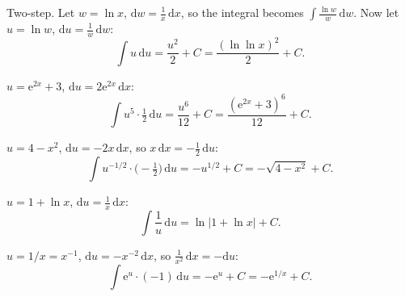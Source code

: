 \begin{solutions}
  \item Two-step. Let $w=\ln x$, $\mathrm{d}w=\tfrac1x\,\mathrm{d}x$, so the
        integral becomes $\int \tfrac{\ln w}{w}\,\mathrm{d}w$. Now let
        $u=\ln w$, $\mathrm{d}u=\tfrac1w\,\mathrm{d}w$:
        \[
          \int u\,\mathrm{d}u
            =\frac{u^{2}}{2}+C=\frac{(\ln\ln x)^{2}}{2}+C .
        \]

  \item $u=\mathrm{e}^{2x}+3$, $\mathrm{d}u=2\mathrm{e}^{2x}\,\mathrm{d}x$:
        \[
          \int u^{5}\cdot\tfrac12\,\mathrm{d}u
            =\frac{u^{6}}{12}+C=\frac{(\mathrm{e}^{2x}+3)^{6}}{12}+C .
        \]

  \item $u=4-x^{2}$, $\mathrm{d}u=-2x\,\mathrm{d}x$, so
        $x\,\mathrm{d}x=-\tfrac12\,\mathrm{d}u$:
        \[
          \int u^{-1/2}\cdot\bigl(-\tfrac12\bigr)\,\mathrm{d}u
            =-u^{1/2}+C=-\sqrt{4-x^{2}}+C .
        \]

  \item $u=1+\ln x$, $\mathrm{d}u=\tfrac1x\,\mathrm{d}x$:
        \[
          \int \frac1u\,\mathrm{d}u=\ln|1+\ln x|+C .
        \]

  \item $u=1/x=x^{-1}$, $\mathrm{d}u=-x^{-2}\,\mathrm{d}x$, so
        $\tfrac{1}{x^{2}}\,\mathrm{d}x=-\mathrm{d}u$:
        \[
          \int \mathrm{e}^{u}\cdot(-1)\,\mathrm{d}u
            =-\mathrm{e}^{u}+C=-\mathrm{e}^{1/x}+C .
        \]
\end{solutions}
